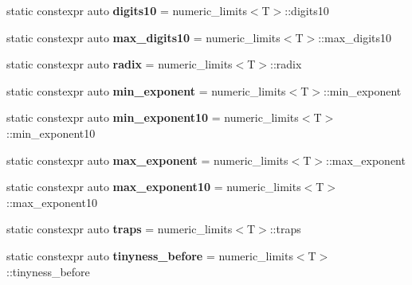 \begin{DoxyCompactItemize}
\item 
\mbox{\label{classstd_1_1numeric__limits_3_01dice_1_1safe_3_01T_01_4_01_4_acbf18f49af3595e02c0cde3cb6b9d2f0}} 
static constexpr auto {\bfseries digits10} = numeric\+\_\+limits$<$T$>$\+::digits10
\item 
\mbox{\label{classstd_1_1numeric__limits_3_01dice_1_1safe_3_01T_01_4_01_4_a2d9255f64505f657301b2f609db98c22}} 
static constexpr auto {\bfseries max\+\_\+digits10} = numeric\+\_\+limits$<$T$>$\+::max\+\_\+digits10
\item 
\mbox{\label{classstd_1_1numeric__limits_3_01dice_1_1safe_3_01T_01_4_01_4_a99bf58f5a834db2086ef3f94e0fe822d}} 
static constexpr auto {\bfseries radix} = numeric\+\_\+limits$<$T$>$\+::radix
\item 
\mbox{\label{classstd_1_1numeric__limits_3_01dice_1_1safe_3_01T_01_4_01_4_ad06799577c289324ceebcf7cc6dd9305}} 
static constexpr auto {\bfseries min\+\_\+exponent} = numeric\+\_\+limits$<$T$>$\+::min\+\_\+exponent
\item 
\mbox{\label{classstd_1_1numeric__limits_3_01dice_1_1safe_3_01T_01_4_01_4_aaa4ad38b271f77d90761bc4bf5f8a2c1}} 
static constexpr auto {\bfseries min\+\_\+exponent10} = numeric\+\_\+limits$<$T$>$\+::min\+\_\+exponent10
\item 
\mbox{\label{classstd_1_1numeric__limits_3_01dice_1_1safe_3_01T_01_4_01_4_aa472b775571085cc9f3f7f5c4c12b73a}} 
static constexpr auto {\bfseries max\+\_\+exponent} = numeric\+\_\+limits$<$T$>$\+::max\+\_\+exponent
\item 
\mbox{\label{classstd_1_1numeric__limits_3_01dice_1_1safe_3_01T_01_4_01_4_a96e8d7765ca27a230ff4b4eda1d83de9}} 
static constexpr auto {\bfseries max\+\_\+exponent10} = numeric\+\_\+limits$<$T$>$\+::max\+\_\+exponent10
\item 
\mbox{\label{classstd_1_1numeric__limits_3_01dice_1_1safe_3_01T_01_4_01_4_a363ca17b4ef8f955dbd563cb27937bb5}} 
static constexpr auto {\bfseries traps} = numeric\+\_\+limits$<$T$>$\+::traps
\item 
\mbox{\label{classstd_1_1numeric__limits_3_01dice_1_1safe_3_01T_01_4_01_4_a8eb808e3678ca8fee5567a1addd96409}} 
static constexpr auto {\bfseries tinyness\+\_\+before} = numeric\+\_\+limits$<$T$>$\+::tinyness\+\_\+before
\end{DoxyCompactItemize}


